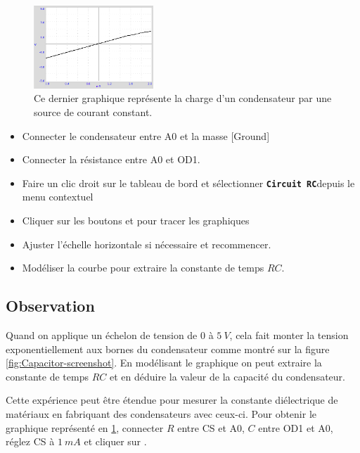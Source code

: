 \documentclass{book}
\newcommand{\nop}{}
\begin{document}
\begin{figure}[h!]
\begin{center}
\caption{\label{fig:Capacitor-screenshot2}Ce dernier graphique représente la charge d'un condensateur par une source de courant constant. }\vspace{0.5em}
\includegraphics[width=0.4\textwidth, height=0.3\textwidth, keepaspectratio]{Pic-capacitor-linear.png}
\end{center}
\end{figure}



\begin{itemize}
  \item Connecter le condensateur entre A0 et la masse [Ground]
  \item Connecter la résistance entre A0 et OD1.
  \item Faire un clic droit sur le tableau de bord et sélectionner  \texttt{\textbf{Circuit RC}\nop}depuis le menu contextuel
  \item Cliquer sur les boutons   et   pour tracer les graphiques
  \item Ajuster l'échelle horizontale si nécessaire et recommencer.
  \item Modéliser   la courbe pour extraire la constante de temps $RC$.
\end{itemize}

\subsection{Observation}


Quand on applique un échelon de tension de $0$ à $5\ V$, cela fait monter la tension exponentiellement aux bornes du condensateur comme montré sur la figure  \ref{fig:Capacitor-screenshot}. En modélisant le graphique on peut extraire la constante de temps $RC$ et en déduire la valeur de la capacité du condensateur.



Cette expérience peut être étendue pour mesurer la constante diélectrique de matériaux en fabriquant des condensateurs avec ceux-ci. Pour obtenir le graphique représenté en  \ref{fig:Capacitor-screenshot2}, connecter $R$ entre CS et A0, $C$ entre OD1 et A0, réglez CS à $1\ mA$ et cliquer sur  .
\end{document}
